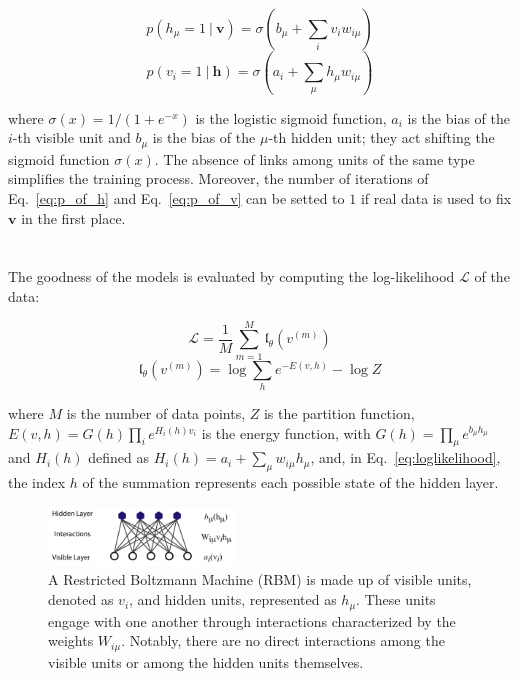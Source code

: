 \documentclass[prl,twocolumn]{revtex4-1}
\begin{document}
\begin{equation}
	p(h_\mu=1\ |\ \mathbf{v}) = \sigma(b_\mu + \sum_{i}v_iw_{i\mu})
	\label{eq:p_of_h}
\end{equation}
\begin{equation}
	p(v_i=1\ |\ \mathbf{h}) = \sigma(a_i + \sum_{\mu}h_{\mu}w_{i\mu})
	\label{eq:p_of_v}
\end{equation}

where $\sigma(x)=1/(1+e^{-x})$ is the logistic sigmoid function, $a_i$ is the bias of the $i$-th visible unit and $b_\mu$ is the bias of the $\mu$-th hidden unit; they act shifting the sigmoid function $\sigma(x)$. The absence of links among units of the same type simplifies the training process. Moreover, the number of iterations of Eq.~\ref{eq:p_of_h} and Eq.~\ref{eq:p_of_v} can be setted to $1$ if real data is used to fix $\mathbf{v}$ in the first place.
\\
\\
\\
The goodness of the models is evaluated by computing the log-likelihood $\mathcal{L}$ of the data:

\begin{equation}
	\mathcal{L}=\frac{1}{M}\sum_{m=1}^{M}{\mathfrak{l}_{\theta}(v^{(m)})}
	\label{eq:Loglikelihood}
\end{equation}
\begin{equation}
	\mathfrak{l}_{\theta}(v^{(m)})=\log\sum_{h}{e^{-E(v,h)}-\log{Z}}
	\label{eq:loglikelihood}
\end{equation}

where $M$ is the number of data points, $Z$ is the partition function, $E(v,h)=G(h)\prod_{i}{e^{H_i(h)v_i}}$ is the energy function, with $G(h)=\prod_{\mu}{e^{b_{\mu}h_{\mu}}}$ and $H_i(h)$ defined as $H_i(h)=a_i+\sum_{\mu}w_{i\mu}h_\mu$, and, in Eq.~\ref{eq:loglikelihood}, the index $h$ of the summation represents each possible state of the hidden layer.

\begin{figure}[!tb]
	\includegraphics[width=0.44\textwidth]{RBM_structure.png}
	\caption{A Restricted Boltzmann Machine (RBM) is made up of visible units, denoted as $v_i$, and hidden units, represented as $h_\mu$. These units engage with one another through interactions characterized by the weights $W_{i\mu}$. Notably, there are no direct interactions among the visible units or among the hidden units themselves.}
	\label{fig:RBM_architecture}
\end{figure}
\end{document}

